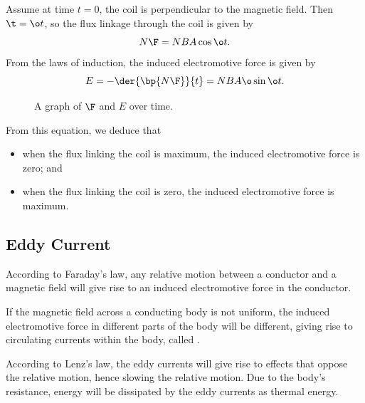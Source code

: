 Assume at time $t = 0$, the coil is perpendicular to the magnetic field. Then $\t = \o t$, so the flux linkage through the coil is given by \[N\F = NBA\cos{\o t}.\] From the laws of induction, the induced electromotive force is given by \[E = -\der{\bp{N\F}}{t} = NBA\o \sin{\o t}.\]

\begin{figure}[H]
    \centering
    \caption{A graph of $\F$ and $E$ over time.}
\end{figure}

From this equation, we deduce that
\begin{itemize}
    \item when the flux linking the coil is maximum, the induced electromotive force is zero; and
    \item when the flux linking the coil is zero, the induced electromotive force is maximum.
\end{itemize}

\subsection{Eddy Current}

According to Faraday's law, any relative motion between a conductor and a magnetic field will give rise to an induced electromotive force in the conductor.

If the magnetic field across a conducting body is not uniform, the induced electromotive force in different parts of the body will be different, giving rise to circulating currents within the body, called .

According to Lenz's law, the eddy currents will give rise to effects that oppose the relative motion, hence slowing the relative motion. Due to the body's resistance, energy will be dissipated by the eddy currents as thermal energy.